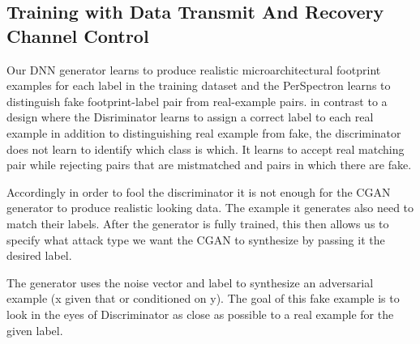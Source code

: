 
 




 \subsection{Training with Data Transmit And Recovery Channel Control}
 

 
 Our DNN generator learns to produce realistic microarchitectural footprint examples for each label in the training dataset and the PerSpectron learns to distinguish fake footprint-label pair from real-example pairs.   
 in contrast to a design where the Disriminator learns to assign a correct label to each real example in addition to distinguishing real example from fake, the discriminator does not learn to identify which class is which.  It learns to accept real matching pair while rejecting pairs that are mistmatched and pairs in which there are fake. 
 
 Accordingly in order to fool the discriminator it is not enough for the CGAN generator to produce realistic looking data. The example it generates also need to match their labels. After the generator is fully trained, this then allows us to specify what attack type we want the CGAN to synthesize by passing it the desired label. 
 
 The generator uses the noise vector and label to synthesize an adversarial example (x given that or conditioned on y). The goal of this fake example is to look in the eyes of Discriminator as close as possible to a real example for the given label.  
 
